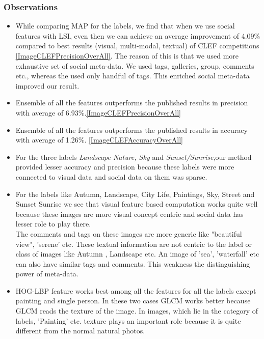 \subsubsection*{Observations}

\begin{itemize}
\item While comparing MAP for the labels, we find that when we use social features with LSI, even then we can achieve an average 
improvement of 4.09\% compared to best results (visual, multi-modal, textual) of CLEF competitions \ref{ImageCLEFPrecisionOverAll}. The reason of this is that we used more exhaustive set of social meta-data. We used tags, galleries, group, comments etc., whereas the \citet*{CLEF} used only handful of tags. This enriched social meta-data improved our result.
\item Ensemble of all the features outperforms the published results in precision with average of 6.93\%.\ref{ImageCLEFPrecisionOverAll}
\item Ensemble of all the features outperforms the published results in accuracy with average of 1.26\%. \ref{ImageCLEFAccuracyOverAll}
\item For the three labels \textit{Landscape Nature, Sky} and \textit{Sunset/Sunrise},our method provided lesser accuracy and 
precision because these labels were more connected to visual data and social data on them was sparse.
\item For the labels like Autumn, Landscape,  City Life, Paintings, Sky, Street and Sunset Sunrise we see that visual feature based computation works quite well because these images are more visual concept centric and social data has lesser role to play there.\\
The comments and tags on these images are more generic like "beautiful view", 'serene' etc. These textual information are not centric to the label or class of images like Autumn , Landscape etc. An image of 'sea', 'waterfall' etc can also have similar tags and comments. This weakness the distinguishing power of meta-data.
\item HOG-LBP feature works best among all the features for all the labels except painting and single person. In these two cases GLCM
works better because GLCM reads the texture of the image. In images, which lie in the category of labels, 'Painting' etc. texture plays an important role because it is quite different from the normal natural photos.
\end{itemize}
